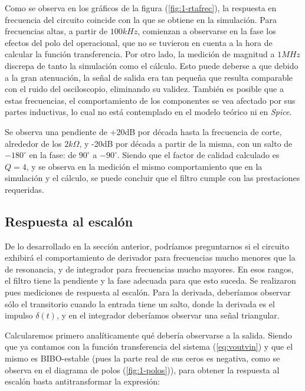 \documentclass[../../tc_tp3_main.tex]{subfiles}
\begin{document}
Como se observa en los gr\'aficos de la figura (\ref{fig:1-rtafrec}), la respuesta en frecuencia del circuito coincide con la que se obtiene en la simulaci\'on. Para frecuencias altas, a partir de $100kHz$, comienzan a observarse en la fase los efectos del polo del operacional, que no se tuvieron en cuenta a la hora de calcular la funci\'on transferencia. Por otro lado, la medici\'on de magnitud a $1MHz$ discrepa de tanto la simulaci\'on como el c\'alculo. Esto puede deberse a que debido a la gran atenuaci\'on, la se\~nal de salida era tan peque\~na que resulta comparable con el ruido del osciloscopio, eliminando su validez. Tambi\'en es posible que a estas frecuencias, el comportamiento de los componentes se vea afectado por sus partes inductivas, lo cual no est\'a contemplado en el modelo te\'orico ni en \textit{Spice}. \par

Se observa una pendiente de +20dB por d\'ecada hasta la frecuencia de corte, alrededor de los $2k\Omega$, y -20dB por d\'ecada a partir de la misma, con un salto de $-180^\circ$ en la fase: de $90^\circ$ a $-90^\circ$. Siendo que el factor de calidad calculado es $Q=4$, y se observa en la medici\'on el mismo comportamiento que en la simulaci\'on y el c\'alculo, se puede concluir que el filtro cumple con las prestaciones requeridas. 

\subsection{Respuesta al escal\'on}


De lo desarrollado en la secci\'on anterior, podr\'iamos preguntarnos si el circuito exhibir\'a el comportamiento de derivador para frecuencias mucho menores que la de resonancia, y de integrador para frecuencias mucho mayores. En esos rangos, el filtro tiene la pendiente y la fase adecuada para que esto suceda. Se realizaron pues mediciones de respuesta al escal\'on. Para la derivada, deber\'iamos observar s\'olo el transitorio cuando la entrada tiene un salto, donde la derivada es el impulso $\delta(t)$, y en el integrador deber\'iamos observar una se\~nal triangular.

Calcularemos primero anal\'iticamente qu\'e deber\'ia observarse a la salida. Siendo que ya contamos con la funci\'on transferencia del sistema (\ref{eq:voutvin}) y que el mismo es BIBO-estable (pues la parte real de sus ceros es negativa, como se observa en el diagrama de polos (\ref{fig:1-polos})), para obtener la respuesta al escal\'on basta antitransformar la expresi\'on:
\end{document}
